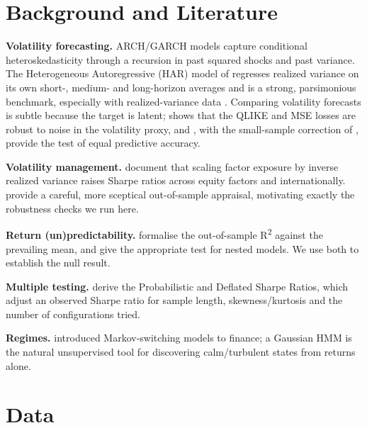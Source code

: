 \documentclass[11pt]{article}
\begin{document}
\section{Background and Literature}

\textbf{Volatility forecasting.} ARCH/GARCH models
\citep{engle1982autoregressive,bollerslev1986generalized} capture conditional
heteroskedasticity through a recursion in past squared shocks and past variance.
The Heterogeneous Autoregressive (HAR) model of \citet{corsi2009simple}
regresses realized variance on its own short-, medium- and long-horizon averages
and is a strong, parsimonious benchmark, especially with realized-variance data
\citep{andersen2003modeling}. Comparing volatility forecasts is subtle because
the target is latent; \citet{patton2011volatility} shows that the QLIKE and MSE
losses are robust to noise in the volatility proxy, and
\citet{diebold1995comparing}, with the small-sample correction of
\citet{harvey1997testing}, provide the test of equal predictive accuracy.

\textbf{Volatility management.} \citet{moreira2017volatility} document that
scaling factor exposure by inverse realized variance raises Sharpe ratios across
equity factors and internationally. \citet{cederburg2020economic} provide a
careful, more sceptical out-of-sample appraisal, motivating exactly the
robustness checks we run here.

\textbf{Return (un)predictability.} \citet{campbell2008predicting} formalise the
out-of-sample R\textsuperscript{2} against the prevailing mean, and
\citet{clark2007approximately} give the appropriate test for nested models. We
use both to establish the null result.

\textbf{Multiple testing.} \citet{bailey2012sharpe,bailey2014deflated} derive the
Probabilistic and Deflated Sharpe Ratios, which adjust an observed Sharpe ratio
for sample length, skewness/kurtosis and the number of configurations tried.

\textbf{Regimes.} \citet{hamilton1989new} introduced Markov-switching models to
finance; a Gaussian HMM is the natural unsupervised tool for discovering
calm/turbulent states from returns alone.

\section{Data}
\end{document}
